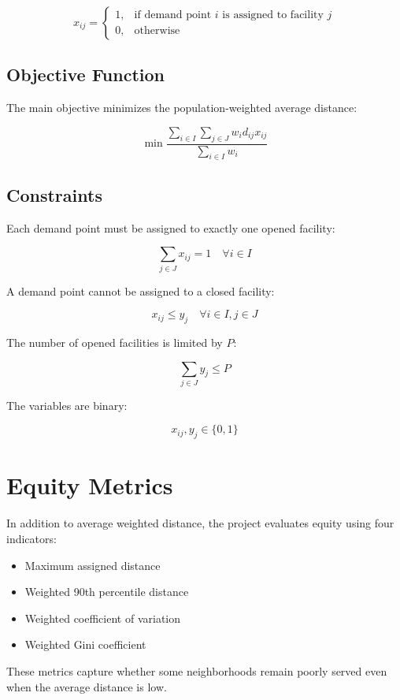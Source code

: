 \documentclass[11pt,a4paper]{article}
\begin{document}
\[
x_{ij} =
\begin{cases}
1, & \text{if demand point } i \text{ is assigned to facility } j \\
0, & \text{otherwise}
\end{cases}
\]

\subsection{Objective Function}

The main objective minimizes the population-weighted average distance:

\[
\min \frac{\sum_{i \in I} \sum_{j \in J} w_i d_{ij} x_{ij}}
{\sum_{i \in I} w_i}
\]

\subsection{Constraints}

Each demand point must be assigned to exactly one opened facility:

\[
\sum_{j \in J} x_{ij} = 1 \quad \forall i \in I
\]

A demand point cannot be assigned to a closed facility:

\[
x_{ij} \leq y_j \quad \forall i \in I, j \in J
\]

The number of opened facilities is limited by $P$:

\[
\sum_{j \in J} y_j \leq P
\]

The variables are binary:

\[
x_{ij}, y_j \in \{0,1\}
\]

\section{Equity Metrics}

In addition to average weighted distance, the project evaluates equity using four indicators:

\begin{itemize}
    \item Maximum assigned distance
    \item Weighted 90th percentile distance
    \item Weighted coefficient of variation
    \item Weighted Gini coefficient
\end{itemize}

These metrics capture whether some neighborhoods remain poorly served even when the average distance is low.
\end{document}
